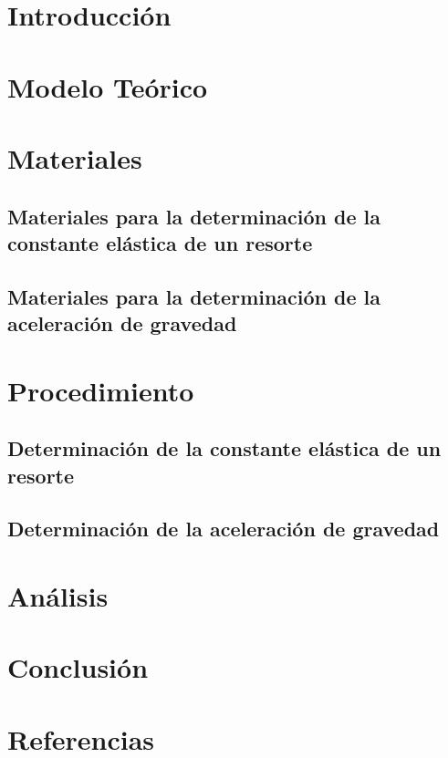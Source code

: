 \documentclass{article}
\begin{document}
\begin{multicols}{2}

\section{Introducción}


\section{Modelo Teórico}



\section{Materiales}

    \subsection{Materiales para la determinación de la constante elástica de un resorte}

    \subsection{Materiales para la determinación de la aceleración de gravedad}

\section{Procedimiento}

\subsection{Determinación de la constante elástica de un resorte}

\subsection{Determinación de la aceleración de gravedad}

\section{Análisis}

\section{Conclusión}

\section{Referencias}

\end{multicols}
\end{document}
